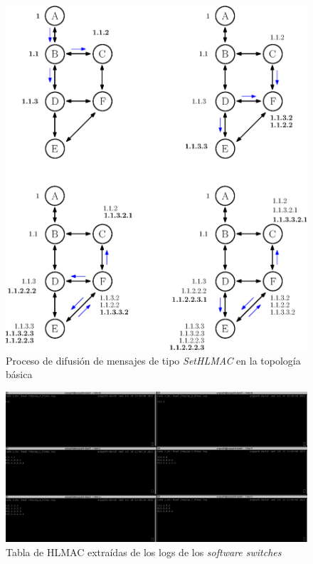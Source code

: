 \begin{figure}[ht]
    \centering
    \includegraphics[width=\textwidth]{archivos/img/dev/topo_sethlmac.eps}
    \caption{Proceso de difusión de mensajes de tipo \textit{SetHLMAC} en la topología básica}
    \label{fig:topo_sethlmac}
\end{figure}

\begin{figure}[ht!]
    \centering
    \includegraphics[width=\textwidth]{archivos/img/dev/hlmac_real.png}
    \caption{Tabla de HLMAC extraídas de los logs de los \textit{software switches}}
    \label{fig:hlmac_real}
\end{figure}

